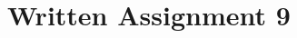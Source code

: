 \documentclass[]{svmono}
\begin{document}
\chapter{Written Assignment 9}

\noindent




%






\nocite{*}

















\end{document}
